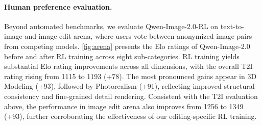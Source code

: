 \documentclass{llmxive}
\begin{document}
\paragraph{Human preference evaluation.}
Beyond automated benchmarks, we evaluate Qwen-Image-2.0-RL on text-to-image and image edit arena, where users vote between anonymized image pairs from competing models. \cref{fig:arena} presents the Elo ratings of Qwen-Image-2.0 before and after RL training across eight sub-categories. RL training yields substantial Elo rating improvements across all dimensions, with the overall T2I rating rising from 1115 to 1193 (+78). The most pronounced gains appear in 3D Modeling (+93), followed by Photorealism (+91), reflecting improved structural consistency and fine-grained detail rendering. Consistent with the T2I evaluation above, the performance in image edit arena also improves from 1256 to 1349 (+93), further corroborating the effectiveness of our editing-specific RL training.
\end{document}
